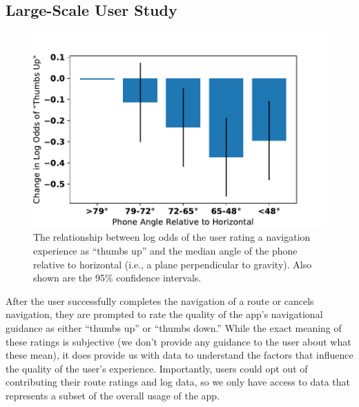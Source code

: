 \documentclass[chi]{sigchi}
\begin{document}
\subsection{Large-Scale User Study}\label{sec:largescalestudy}
\begin{figure}
\includegraphics[width=\linewidth]{figures/phoneangle}
\caption{The relationship between log odds of the user rating a navigation experience as ``thumbs up'' and the median angle of the phone relative to horizontal (i.e., a plane perpendicular to gravity).  Also shown are the 95\% confidence intervals.\label{fig:devicepose}}
\end{figure}

After the user successfully completes the navigation of a route or cancels navigation, they are prompted to rate the quality of the app's navigational guidance as either ``thumbs up'' or ``thumbs down.''   While the exact meaning of these ratings is subjective (we don't provide any guidance to the user about what these mean), it does provide us with data to understand the factors that influence the quality of the user's experience.  Importantly, users could opt out of contributing their route ratings and log data, so we only have access to data that represents a subset of the overall usage of the app.
\end{document}
